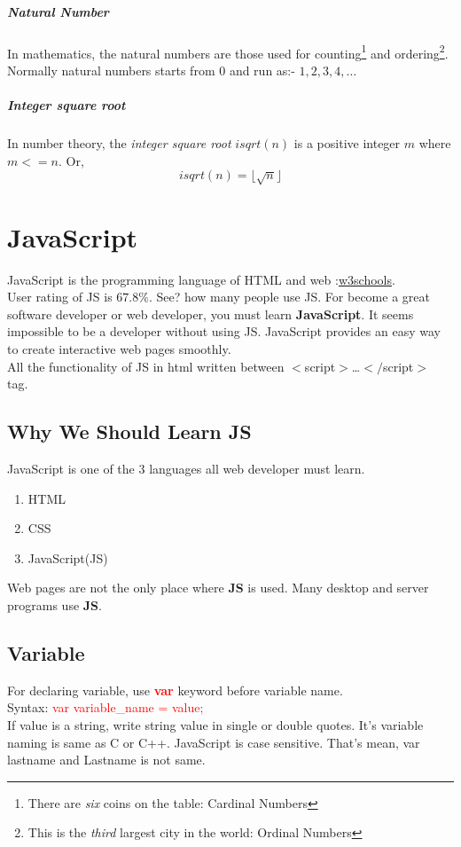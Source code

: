 \documentclass[10 pt]{book}
\begin{document}
\begin{enumerate}
\paragraph{Natural Number}
In mathematics, the natural numbers are those used for counting\footnote{There are \textit{six} coins on the table: Cardinal Numbers} and ordering\footnote{This is the \textit{third} largest city in the world: Ordinal Numbers}. Normally natural numbers starts from $0$ and run as:- $1, 2, 3, 4,\dots$

\paragraph{Integer square root}
In number theory, the \textit{integer square root} $isqrt(n)$ is a positive integer $m$ where $m <= n$. Or, $$isqrt(n) = \lfloor\sqrt{n}\rfloor$$

\chapter{JavaScript}
JavaScript is the programming language of HTML and web :\href{https://www.w3schools.com/js/}{w3schools}.\\
User rating of JS is $67.8\%$. See? how many people use JS. For become a great software developer or web developer, you must learn \textbf{JavaScript}. It seems impossible to be a developer without using JS. JavaScript provides an easy way to create interactive web pages smoothly.\\
All the functionality of JS in html written between $<$script$>$\dots$</$script$>$ tag.
\section{Why We Should Learn JS}
JavaScript is one of the 3 languages all web developer must learn.\\
\begin{enumerate}
 \item HTML
 \item CSS
 \item JavaScript(JS)
\end{enumerate}
Web pages are not the only place where \textbf{JS} is used. Many desktop and server programs use \textbf{JS}.
\section{Variable}
For declaring variable, use \textbf{\textcolor{red}{var}} keyword before variable name.\\
Syntax: \textcolor{red}{var variable\_name = value;}\\
If value is a string, write string value in single or double quotes. It's variable naming is same as C or C++. JavaScript is case sensitive. That's mean, var lastname and Lastname is not same.

\end{enumerate}
\end{document}
